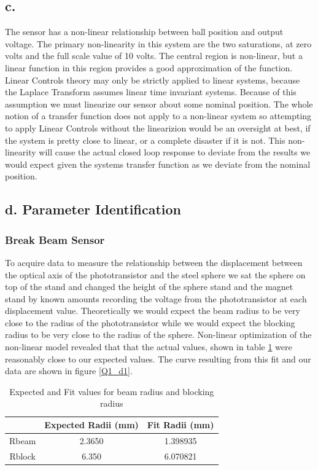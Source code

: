 \documentclass{article}
\theoremstyle{plain}
\theoremstyle{definition}
\theoremstyle{remark}
\begin{document}
\subsection*{c.}
The sensor has a non-linear relationship between ball position and output voltage.  The primary non-linearity in this system are the two saturations, at zero volts and the full scale value of 10 volts.  The central region is non-linear, but a linear function in this region provides a good approximation of the function.  Linear Controls theory may only be strictly applied to linear systems, because the Laplace Transform assumes linear time invariant systems.  Because of this assumption we must linearize our sensor about some nominal position.  The whole notion of a transfer function does not apply to a non-linear system so attempting to apply Linear Controls without the linearizion would be an oversight at best, if the system is pretty close to linear, or a complete disaster if it is not.  This non-linearity will cause the actual closed loop response to deviate from the results we would expect given the systems transfer function as we deviate from the nominal position.

\subsection*{d. Parameter Identification}

\subsubsection*{Break Beam Sensor}
To acquire data to measure the relationship between the displacement between the optical axis of the phototransistor and the steel sphere we sat the sphere on top of the stand and changed the height of the sphere stand and the magnet stand by known amounts recording the voltage from the phototransistor at each displacement value.  Theoretically we would expect the beam radius to be very close to the radius of the phototransistor while we would expect the blocking radius to be very close to the radius of the sphere.  Non-linear optimization of the non-linear model revealed that that the actual values, shown in table \ref{Q1_dt2} were reasonably close to our expected values.  The curve resulting from this fit and our data are shown in figure \ref{Q1_d1}.

\begin{table}
\begin{center}
    \begin{tabular}{|c|c|c|}
        \hline
        ~      & Expected Radii (mm) & Fit Radii (mm) \\ \hline
        Rbeam  & 2.3650              & 1.398935       \\ 
        Rblock & 6.350               & 6.070821       \\
        \hline
    \end{tabular}
\caption{Expected and Fit values for beam radius and blocking radius}
\label{Q1_dt2}
\end{center}
\end{table}
\end{document}
